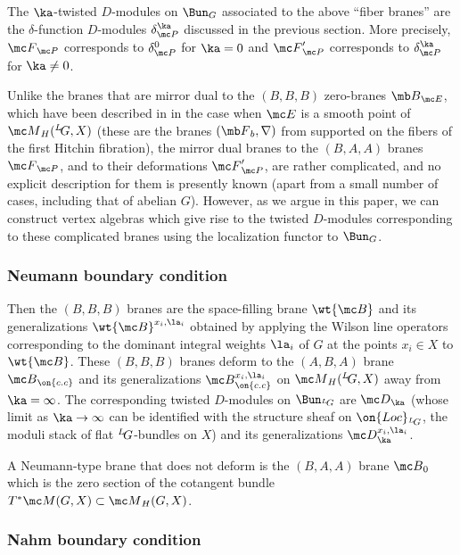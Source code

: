 \documentclass[11pt,reqno]{amsart}
\theoremstyle{plain}
\numberwithin{equation}{section}
\def\neg{\negthinspace}
\def\LG{{}^L\neg G}
\theoremstyle{definition}
\begin{document}
The $\ka$-twisted $D$-modules on $\Bun_G$ associated to the above
``fiber branes'' are the $\delta$-function $D$-modules
$\delta^\ka_{\mc P}$ discussed in the previous section. More
precisely, ${\mc F}_{\mc P}$ corresponds to $\delta^0_{\mc P}$ for
$\ka=0$ and ${\mc F}'_{\mc P}$ corresponds to $\delta^\ka_{\mc P}$ for
$\ka \neq 0$.

Unlike the branes that are mirror dual to the $(B,B,B)$ zero-branes
${\mb B}_{\mc E}$, which have been described in \cite{KW} in the case
when ${\mc E}$ is a smooth point of ${\mc M}_H(\LG,X)$ (these are the
branes $({\mb F}_b,\nabla)$ from supported on the fibers of the first
Hitchin fibration), the mirror dual branes to the $(B,A,A)$ branes
${\mc F}_{\mc P}$, and to their deformations ${\mc F}'_{\mc P}$, are
rather complicated, and no explicit description for them is presently
known (apart from a small number of cases, including that of abelian
$G$). However, as we argue in this paper, we can construct vertex
algebras which give rise to the twisted $D$-modules corresponding to
these complicated branes using the localization functor to $\Bun_G$.

\subsubsection{Neumann boundary condition} Then the $(B,B,B)$ branes
are the space-filling brane $\wt{\mc B}$ and its generalizations
$\wt{\mc B}^{x_i,\la_i}$ obtained by applying the Wilson line
operators corresponding to the dominant integral weights $\la_i$ of
$G$ at the points $x_i \in X$ to $\wt{\mc B}$. These $(B,B,B)$ branes
deform to the $(A,B,A)$ brane ${\mc B}_{\on{c.c}}$ and its
generalizations ${\mc B}_{\on{c.c}}^{x_i,\la_i}$ on ${\mc M}_H(\LG,X)$
away from $\ka=\infty$. The corresponding twisted $D$-modules on
$\Bun_{\LG}$ are ${\mc D}_\ka$ (whose limit as $\ka \to \infty$ can be
identified with the structure sheaf on $\on{Loc}_{\LG}$, the moduli
stack of flat $\LG$-bundles on $X$) and its generalizations ${\mc
  D}_\ka^{x_i,\la_i}$.

A Neumann-type brane that does not deform is the $(B,A,A)$ brane ${\mc
  B}_0$ which is the zero section of the cotangent bundle $T^* {\mc
  M}(G,X) \subset {\mc M}_H(G,X)$.

\subsubsection{Nahm boundary condition}    \label{nahm branes}
\end{document}
